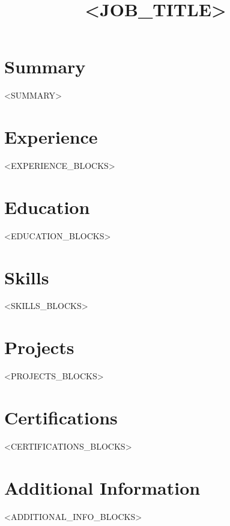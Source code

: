 \documentclass[11pt,a4paper,sans]{moderncv}
\title{<JOB_TITLE>}
\begin{document}
\makecvtitle

\section{Summary}
<SUMMARY>

\section{Experience}
<EXPERIENCE_BLOCKS>

\section{Education}
<EDUCATION_BLOCKS>

\section{Skills}
<SKILLS_BLOCKS>

\section{Projects}
<PROJECTS_BLOCKS>

\section{Certifications}
<CERTIFICATIONS_BLOCKS>

\section{Additional Information}
<ADDITIONAL_INFO_BLOCKS>
\end{document}
